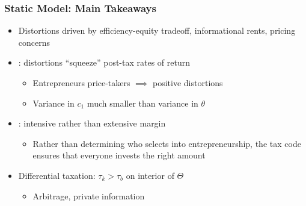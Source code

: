 \documentclass{beamer}
\begin{document}
\begin{frame}
    \frametitle{Static Model: Main Takeaways}

    \begin{itemize}
        \item Distortions driven by efficiency-equity tradeoff, informational rents, pricing concerns 
        \item \cite{farhi2010progressive}: distortions ``squeeze'' post-tax rates of return 
        \begin{itemize}
            \item Entrepreneurs price-takers \( \implies \) positive distortions
        \end{itemize}
        \begin{itemize}
            \item Variance in \( c_1 \) much smaller than variance in \( \theta \)
        \end{itemize}
        \item \cite{scheuer2014entrepreneurial}: intensive rather than extensive margin
        \begin{itemize}
            \item Rather than determining who selects into entrepreneurship, the tax code ensures that everyone invests the right amount 
        \end{itemize}
        \item Differential taxation: \( \tau_k > \tau_b \) on interior of \( \Theta \)
        \begin{itemize}
            \item Arbitrage, private information
        \end{itemize}
    \end{itemize}

\end{frame}
\end{document}
